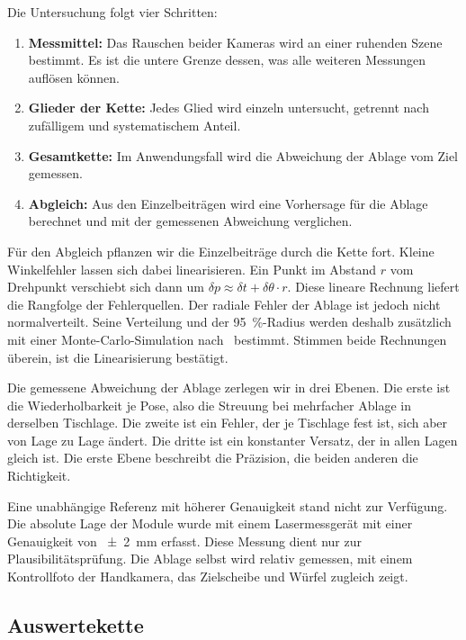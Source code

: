 Die Untersuchung folgt vier Schritten:
\begin{enumerate}
    \item \textbf{Messmittel:} Das Rauschen beider Kameras wird an einer ruhenden Szene bestimmt. Es ist die untere Grenze dessen, was alle weiteren Messungen auflösen können.
    \item \textbf{Glieder der Kette:} Jedes Glied wird einzeln untersucht, getrennt nach zufälligem und systematischem Anteil.
    \item \textbf{Gesamtkette:} Im Anwendungsfall wird die Abweichung der Ablage vom Ziel gemessen.
    \item \textbf{Abgleich:} Aus den Einzelbeiträgen wird eine Vorhersage für die Ablage berechnet und mit der gemessenen Abweichung verglichen.
\end{enumerate}

Für den Abgleich pflanzen wir die Einzelbeiträge durch die Kette fort. Kleine Winkelfehler lassen sich dabei linearisieren. Ein Punkt im Abstand $r$ vom Drehpunkt verschiebt sich dann um $\delta p \approx \delta t + \delta\theta \cdot r$. Diese lineare Rechnung liefert die Rangfolge der Fehlerquellen. Der radiale Fehler der Ablage ist jedoch nicht normalverteilt. Seine Verteilung und der \qty{95}{\percent}-Radius werden deshalb zusätzlich mit einer Monte-Carlo-Simulation nach~\cite{JCGM101} bestimmt. Stimmen beide Rechnungen überein, ist die Linearisierung bestätigt.

Die gemessene Abweichung der Ablage zerlegen wir in drei Ebenen. Die erste ist die Wiederholbarkeit je Pose, also die Streuung bei mehrfacher Ablage in derselben Tischlage. Die zweite ist ein Fehler, der je Tischlage fest ist, sich aber von Lage zu Lage ändert. Die dritte ist ein konstanter Versatz, der in allen Lagen gleich ist. Die erste Ebene beschreibt die Präzision, die beiden anderen die Richtigkeit.

Eine unabhängige Referenz mit höherer Genauigkeit stand nicht zur Verfügung. Die absolute Lage der Module wurde mit einem Lasermessgerät mit einer Genauigkeit von \qty{\pm 2}{\milli\metre} erfasst. Diese Messung dient nur zur Plausibilitätsprüfung. %
Die Ablage selbst wird relativ gemessen, mit einem Kontrollfoto der Handkamera, das Zielscheibe und Würfel zugleich zeigt.

\subsection{Auswertekette}
\label{subsec:Auswertekette}

